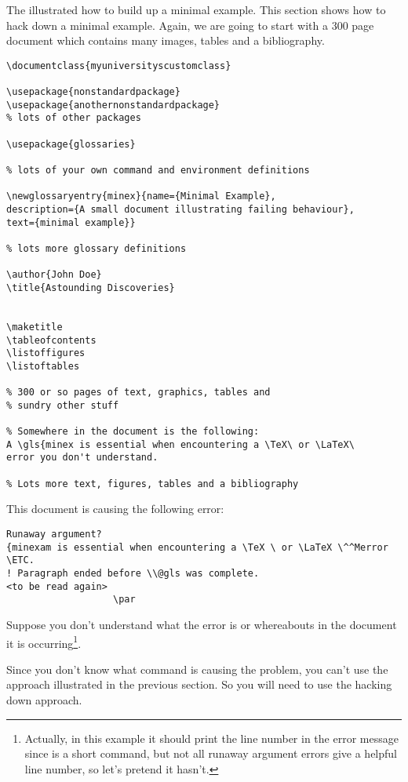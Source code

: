 The  illustrated how to
build up a minimal example. This section shows how to hack down a
minimal example. Again, we are going to start with a 300 page
document which contains many images, tables and a bibliography. 
\begin{verbatim}
\documentclass{myuniversityscustomclass}

\usepackage{nonstandardpackage}
\usepackage{anothernonstandardpackage}
% lots of other packages

\usepackage{glossaries}

% lots of your own command and environment definitions

\newglossaryentry{minex}{name={Minimal Example},
description={A small document illustrating failing behaviour},
text={minimal example}}

% lots more glossary definitions

\author{John Doe}
\title{Astounding Discoveries}


\maketitle
\tableofcontents
\listoffigures
\listoftables

% 300 or so pages of text, graphics, tables and
% sundry other stuff

% Somewhere in the document is the following:
A \gls{minex is essential when encountering a \TeX\ or \LaTeX\ 
error you don't understand.

% Lots more text, figures, tables and a bibliography

\end{verbatim}
This document is causing the following error:
\begin{verbatim}
Runaway argument?
{minexam is essential when encountering a \TeX \ or \LaTeX \^^Merror
\ETC.
! Paragraph ended before \\@gls was complete.
<to be read again>
                   \par
\end{verbatim}
Suppose you don't understand what the error is or whereabouts in the
document it is occurring\footnote{Actually, in this example it
should print the line number in the error message since  is a
short command, but not all runaway argument errors give a helpful
line number, so let's pretend it hasn't. }.

Since you don't know what command is causing the problem, you can't
use the approach illustrated in the previous section. So you will
need to use the hacking down approach.

